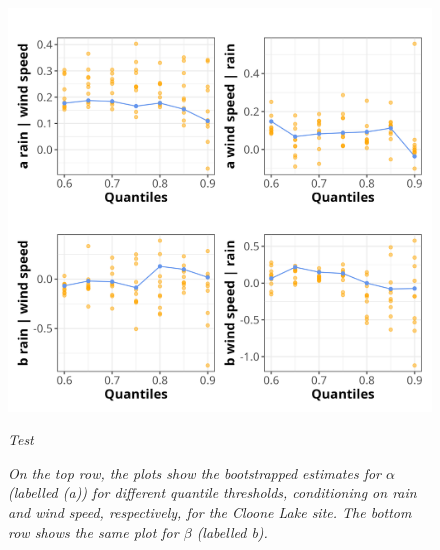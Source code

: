 \documentclass{article}
\numberwithin{equation}{section}
\begin{document}
\begin{figure}[H]
    \centering
    \includegraphics[width = 0.9\linewidth]{plots/042_bootstrap_thresh.png}
    \caption{\emph{Test}}
    \label{fig:04_bootstrap_thresh}
    \caption{\emph{On the top row, the plots show the bootstrapped estimates for $\alpha$ (labelled (a)) for different quantile thresholds, conditioning on rain and wind speed, respectively, for the Cloone Lake site. The bottom row shows the same plot for $\beta$ (labelled b).}}
\end{figure}

% 
% 
\end{document}
